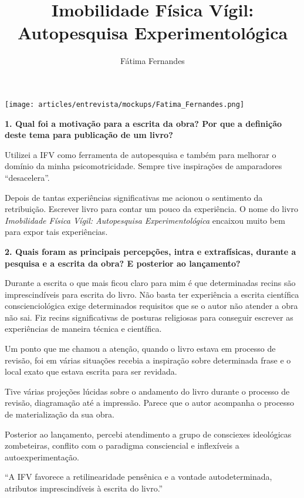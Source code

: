 \documentclass{gescons}
\author{Fátima Fernandes}
\title{Imobilidade Física Vígil: Autopesquisa Experimentológica}
\begin{document}
    \makeentrevistatitle

    \begin{multicols}{2}

\begin{center}
    \texttt{[image: articles/entrevista/mockups/Fatima\_Fernandes.png]}
\end{center}


\textbf{1. Qual foi a motivação para a escrita da obra? Por que a definição deste tema para publicação de um livro?}

Utilizei a IFV como ferramenta de autopesquisa e também para melhorar o domínio da minha psicomotricidade. Sempre tive inspirações de amparadores ``desacelera''.

Depois de tantas experiências significativas me acionou o sentimento da retribuição. Escrever livro para contar um pouco da experiência. O nome do livro \emph{Imobilidade Física Vígil: Autopesquisa Experimentológica} encaixou muito bem para expor tais experiências.


\textbf{2. Quais foram as principais percepções, intra e extrafísicas, durante a pesquisa e a escrita da obra? E posterior ao lançamento?}

Durante a escrita o que mais ficou claro para mim é que determinadas recins são imprescindíveis para escrita do livro. Não basta ter experiência a escrita científica conscienciológica exige determinados requisitos que se o autor não atender a obra não sai. Fiz recins significativas de posturas religiosas para conseguir escrever as experiências de maneira técnica e científica.

Um ponto que me chamou a atenção, quando o livro estava em processo de revisão, foi em várias situações recebia a inspiração sobre determinada frase e o local exato que estava escrita para ser revidada.

Tive várias projeções lúcidas sobre o andamento do livro durante o processo de revisão, diagramação até a impressão. Parece que o autor acompanha o processo de materialização da sua obra.

Posterior ao lançamento, percebi atendimento a grupo de consciexes ideológicas zombeteiras, conflito com o paradigma consciencial e inflexíveis a autoexperimentação.

\begin{pullquote}
``A IFV favorece a retilinearidade pensênica e a vontade autodeterminada, atributos imprescindíveis à escrita do livro.''
\end{pullquote}


\end{multicols}
\end{document}
